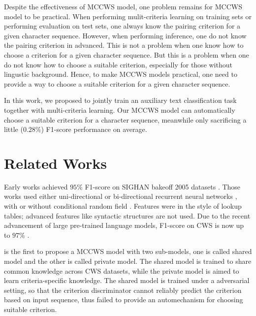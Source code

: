 \documentclass[11pt]{article}
\begin{document}
Despite the effectiveness of MCCWS model, one problem remains for MCCWS model to be practical.
When performing mulit-criteria learning on training sets or performing evaluation on test sets, one always know the pairing criterion for a given character sequence.
However, when performing inference, one do not know the pairing criterion in advanced.
This is not a problem when one know how to choose a criterion for a given character sequence.
But this is a problem when one do not know how to choose a suitable criterion, especially for those without lingustic background.
Hence, to make MCCWS models practical, one need to provide a way to choose a suitable criterion for a given character sequence.

In this work, we proposed to jointly train an auxiliary text classification task together with multi-criteria learning.
Our MCCWS model can automatically choose a suitable criterion for a character sequence, meanwhile only sacrificing a little (\(0.28\%\)) F1-score performance on average.

\section{Related Works}\label{sec:related}

Early works achieved \(95\%\) F1-score on SIGHAN bakeoff 2005 datasets \cite{emerson-2005-second}.
Those works used either uni-directional or bi-directional recurrent neural networks \cite{Schuster-1997-bidirectional,graves-2005-framewise}, with or without conditional random field \cite{chen-etal-2017-adversarial,ma-etal-2018-state,He-2019-effective}.
Features were in the style of lookup tables;
advanced features like syntactic structures are not used.
Due to the recent advancement of large pre-trained language models, F1-score on CWS is now up to \(97\%\) \cite{huang-etal-2020-towards,huang-etal-2020-joint-multiple,ke2020unified,qiu-etal-2020-concise,ke-etal-2021-pre,tong-etal-2022-word}.

\cite{chen-etal-2017-adversarial} is the first to propose a MCCWS model with two sub-models, one is called shared model and the other is called private model.
The shared model is trained to share common knowledge across CWS datasets, while the private model is aimed to learn criteria-specific knowledge.
The shared model is trained under a adversarial setting, so that the criterion discriminator cannot reliably predict the criterion based on input sequence, thus failed to provide an automechanism for choosing suitable criterion.
\end{document}
